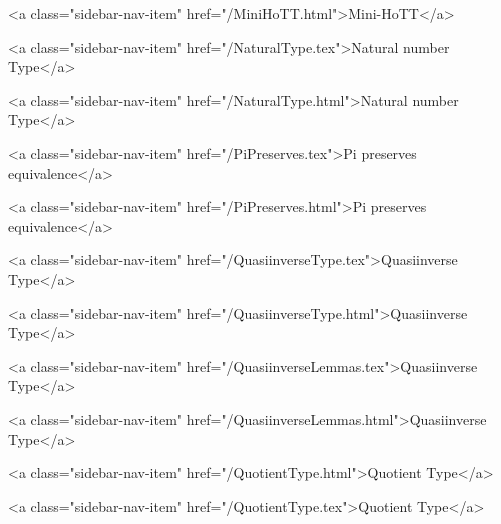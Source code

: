       
        
          <a class="sidebar-nav-item" href="/MiniHoTT.html">Mini-HoTT</a>
        
      
    
      
        
          <a class="sidebar-nav-item" href="/NaturalType.tex">Natural number Type</a>
        
      
    
      
        
          <a class="sidebar-nav-item" href="/NaturalType.html">Natural number Type</a>
        
      
    
      
        
          <a class="sidebar-nav-item" href="/PiPreserves.tex">Pi preserves equivalence</a>
        
      
    
      
        
          <a class="sidebar-nav-item" href="/PiPreserves.html">Pi preserves equivalence</a>
        
      
    
      
        
          <a class="sidebar-nav-item" href="/QuasiinverseType.tex">Quasiinverse Type</a>
        
      
    
      
        
          <a class="sidebar-nav-item" href="/QuasiinverseType.html">Quasiinverse Type</a>
        
      
    
      
        
          <a class="sidebar-nav-item" href="/QuasiinverseLemmas.tex">Quasiinverse Type</a>
        
      
    
      
        
          <a class="sidebar-nav-item" href="/QuasiinverseLemmas.html">Quasiinverse Type</a>
        
      
    
      
        
          <a class="sidebar-nav-item" href="/QuotientType.html">Quotient Type</a>
        
      
    
      
        
          <a class="sidebar-nav-item" href="/QuotientType.tex">Quotient Type</a>
        
